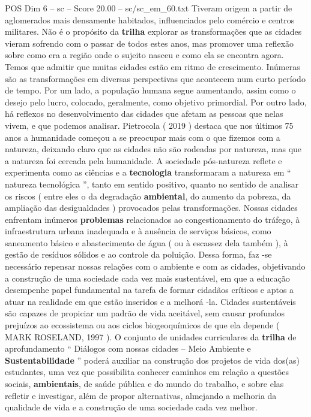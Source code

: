 \begin{textsample}{POS Dim 6 – sc – Score 20.00 – sc/sc\_em\_60.txt}
Tiveram origem a partir de aglomerados mais densamente habitados, influenciados pelo comércio e centros militares.
Não é o propósito da \textbf{trilha} explorar as transformações que as cidades vieram sofrendo com o passar de todos estes anos, mas promover uma reflexão sobre como era a região onde o sujeito nasceu e como ela se encontra agora.
Temos que admitir que muitas cidades estão em ritmo de crescimento.
Inúmeras são as transformações em diversas perspectivas que acontecem num curto período de tempo.
Por um lado, a população humana segue aumentando, assim como o desejo pelo lucro, colocado, geralmente, como objetivo primordial.
Por outro lado, há reflexos no desenvolvimento das cidades que afetam as pessoas que nelas vivem, e que podemos analisar.
Pietrocola ( 2019 ) destaca que nos últimos 75 anos a humanidade começou a se preocupar mais com o que fizemos com a natureza, deixando claro que as cidades não são rodeadas por natureza, mas que a natureza foi cercada pela humanidade.
A sociedade pós-natureza reflete e experimenta como as ciências e a \textbf{tecnologia} transformaram a natureza em “ natureza tecnológica ”, tanto em sentido positivo, quanto no sentido de analisar os riscos ( entre eles o da degradação \textbf{ambiental}, do aumento da pobreza, da ampliação das desigualdades ) provocados pelas transformações.
Nossas cidades enfrentam inúmeros \textbf{problemas} relacionados ao congestionamento do tráfego, à infraestrutura urbana inadequada e à ausência de serviços básicos, como saneamento básico e abastecimento de água ( ou à escassez dela também ), à gestão de resíduos sólidos e ao controle da poluição.
Dessa forma, faz -se necessário repensar nossas relações com o ambiente e com as cidades, objetivando a construção de uma sociedade cada vez mais sustentável, em que a educação desempenhe papel fundamental na tarefa de formar cidadãos críticos e aptos a atuar na realidade em que estão inseridos e a melhorá -la.
Cidades sustentáveis são capazes de propiciar um padrão de vida aceitável, sem causar profundos prejuízos ao ecossistema ou aos ciclos biogeoquímicos de que ela depende ( MARK ROSELAND, 1997 ).
O conjunto de unidades curriculares da \textbf{trilha} de aprofundamento “ Diálogos com nossas cidades – Meio Ambiente e \textbf{Sustentabilidade} ” poderá auxiliar na construção dos projetos de vida dos(as) estudantes, uma vez que possibilita conhecer caminhos em relação a questões sociais, \textbf{ambientais}, de saúde pública e do mundo do trabalho, e sobre elas refletir e investigar, além de propor alternativas, almejando a melhoria da qualidade de vida e a construção de uma sociedade cada vez melhor.

\end{textsample}
